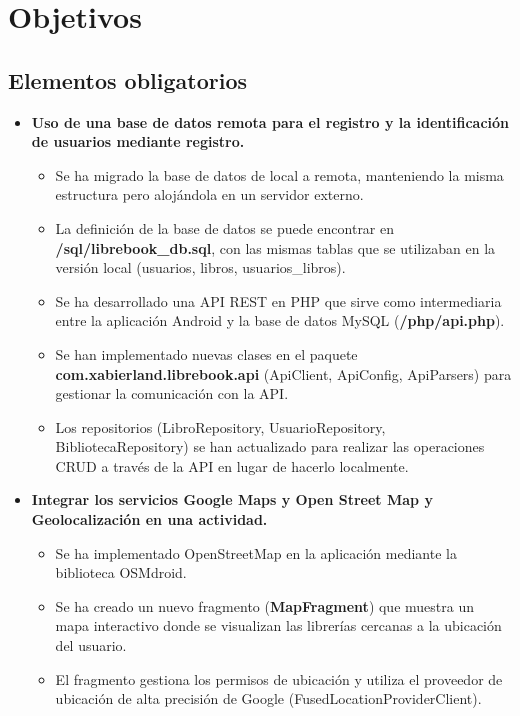 \documentclass[a4paper,11pt]{report}
\begin{document}
  \chapter{Objetivos}
    \section{Elementos obligatorios}
      \begin{itemize}
        \item \textbf{Uso de una base de datos remota para el registro y la identificación de usuarios mediante registro.}
          \begin{itemize}
            \item Se ha migrado la base de datos de local a remota, manteniendo la misma estructura pero alojándola en un servidor externo.
            \item La definición de la base de datos se puede encontrar en \textbf{/sql/librebook\_db.sql}, con las mismas tablas que se utilizaban en la versión local (usuarios, libros, usuarios\_libros).
            \item Se ha desarrollado una API REST en PHP que sirve como intermediaria entre la aplicación Android y la base de datos MySQL (\textbf{/php/api.php}).
            \item Se han implementado nuevas clases en el paquete \textbf{com.xabierland.librebook.api} (ApiClient, ApiConfig, ApiParsers) para gestionar la comunicación con la API.
            \item Los repositorios (LibroRepository, UsuarioRepository, BibliotecaRepository) se han actualizado para realizar las operaciones CRUD a través de la API en lugar de hacerlo localmente.
          \end{itemize} 
        \item \textbf{Integrar los servicios Google Maps y Open Street Map y Geolocalización en una actividad.}
          \begin{itemize}
            \item Se ha implementado OpenStreetMap en la aplicación mediante la biblioteca OSMdroid.
            \item Se ha creado un nuevo fragmento (\textbf{MapFragment}) que muestra un mapa interactivo donde se visualizan las librerías cercanas a la ubicación del usuario.
            \item El fragmento gestiona los permisos de ubicación y utiliza el proveedor de ubicación de alta precisión de Google (FusedLocationProviderClient).

\end{itemize}
\end{itemize}
\end{document}
